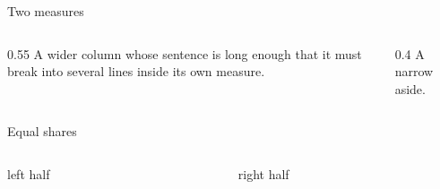 \documentclass[aspectratio=169]{slides}
\begin{document}
\begin{frame}{Two measures}
\begin{columns}[T]
\begin{column}{0.55\textwidth}
A wider column whose sentence is long enough that it must break into
several lines inside its own measure.
\end{column}
\begin{column}{0.4\textwidth}
A narrow aside.
\end{column}
\end{columns}
\end{frame}

\begin{frame}{Equal shares}
\begin{columns}
\begin{column}
left half
\end{column}
\begin{column}
right half
\end{column}
\end{columns}
\end{frame}
\end{document}
